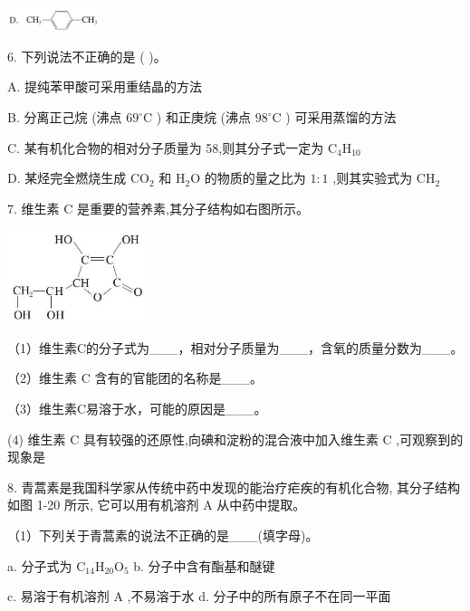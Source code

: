 \documentclass[10pt]{article}
\begin{document}
\begin{center}
\includegraphics[max width=0.2\textwidth]{images/0190efc5-b58a-7c43-bfb0-e0a030df9cfd_31_335637.jpg}
\end{center}

6. 下列说法不正确的是 ( )。

A. 提纯苯甲酸可采用重结晶的方法

B. 分离正己烷 (沸点 \({69}^{ \circ }\mathrm{C}\) ) 和正庚烷 (沸点 \({98}^{ \circ }\mathrm{C}\) ) 可采用蒸馏的方法

C. 某有机化合物的相对分子质量为 58,则其分子式一定为 \({\mathrm{C}}_{4}{\mathrm{H}}_{10}\)

D. 某烃完全燃烧生成 \({\mathrm{{CO}}}_{2}\) 和 \({\mathrm{H}}_{2}\mathrm{O}\) 的物质的量之比为 \(1 : 1\) ,则其实验式为 \({\mathrm{{CH}}}_{2}\)

7. 维生素 \(\mathrm{C}\) 是重要的营养素,其分子结构如右图所示。

\begin{center}
\includegraphics[max width=0.3\textwidth]{images/0190efc5-b58a-7c43-bfb0-e0a030df9cfd_31_808018.jpg}
\end{center}

（1）维生素C的分子式为\_\_\_，相对分子质量为\_\_\_，含氧的质量分数为\_\_\_。

（2）维生素 \(\mathrm{C}\) 含有的官能团的名称是\_\_\_。

（3）维生素C易溶于水，可能的原因是\_\_\_。

(4) 维生素 \(\mathrm{C}\) 具有较强的还原性,向碘和淀粉的混合液中加入维生素 \(\mathrm{C}\) ,可观察到的现象是

8. 青蒿素是我国科学家从传统中药中发现的能治疗疟疾的有机化合物, 其分子结构如图 1-20 所示, 它可以用有机溶剂 \(\mathrm{A}\) 从中药中提取。

（1）下列关于青蒿素的说法不正确的是\_\_\_(填字母)。

a. 分子式为 \({\mathrm{C}}_{14}{\mathrm{H}}_{20}{\mathrm{O}}_{5}\) b. 分子中含有酯基和醚键

c. 易溶于有机溶剂 \(\mathrm{A}\) ,不易溶于水 d. 分子中的所有原子不在同一平面
\end{document}
